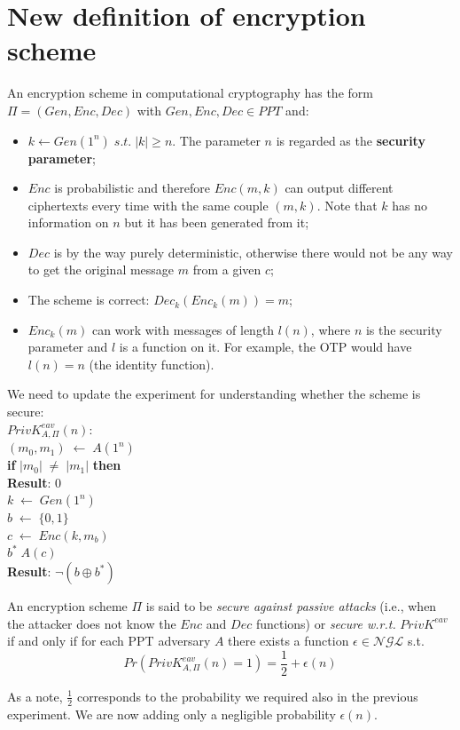\documentclass[../main]{subfiles}
\begin{document}
\section{New definition of encryption scheme}
An encryption scheme in computational cryptography has the form $\Pi{} = (Gen, Enc, Dec)$ with $Gen, Enc, Dec \in{} PPT$ and:
\begin{itemize}
    \item $k \leftarrow{} Gen(1^n) \; s.t. \; |k| \ge{} n$. The parameter $n$ is regarded as the \textbf{security parameter};
    \item $Enc$ is probabilistic and therefore $Enc(m, k)$ can output different ciphertexts every time with the same couple $(m, k)$. Note that $k$ has no information on $n$ but it has been generated from it;
    \item $Dec$ is by the way purely deterministic, otherwise there would not be any way to get the original message $m$ from a given $c$;
    \item The scheme is correct: $Dec_k(Enc_k(m)) = m$;
    \item $Enc_k(m)$ can work with messages of length $l(n)$, where $n$ is the security parameter and $l$ is a function on it. For example, the OTP would have $l(n) = n$ (the identity function).
\end{itemize}
We need to update the experiment for understanding whether the scheme is secure:\\
$PrivK^{eav}_{A,\Pi}(n)$:\\
$(m_0,m_1) \; \leftarrow{} \; A(1^n)$\\
\textbf{if} $|m_0| \; \neq{} \; |m_1|$ \textbf{then}\\
\hspace*{20pt}\textbf{Result}: 0\\
$k \; \leftarrow{} \; Gen(1^n)$\\
$b \; \leftarrow{} \; \{0,1\}$\\
$c \; \leftarrow{} \; Enc(k,m_b)$\\
$b^* \; A(c)$\\
\textbf{Result}: $\neg(b \oplus{} b^*)$
\begin{definition}
    An encryption scheme $\Pi$ is said to be \textit{secure against passive attacks} (i.e., when the attacker does not know the $Enc$ and $Dec$ functions) or \textit{secure w.r.t.} $PrivK^{eav}$
    if and only if for each PPT adversary $A$ there exists a function $\epsilon{} \in{} \mathcal{NGL}$ s.t.
    $$Pr(PrivK^{eav}_{A,\Pi}(n) = 1) = \frac{1}{2} + \epsilon(n)$$
\end{definition}
As a note, $\frac{1}{2}$ corresponds to the probability we required also in the previous experiment. We are now adding only a negligible probability $\epsilon(n)$.
\end{document}

